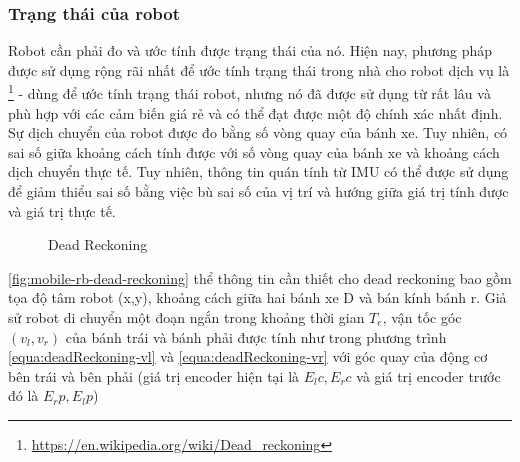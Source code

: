 {\subsubsection*{Trạng thái của robot}
Robot cần phải đo và ước tính được trạng thái của nó. Hiện nay, phương pháp được sử dụng rộng rãi nhất để ước tính trạng thái trong nhà cho robot dịch vụ là \footnote{\url{https://en.wikipedia.org/wiki/Dead_reckoning}} - dùng để ước tính trạng thái robot, nhưng nó đã được sử dụng từ rất lâu và phù hợp với các cảm biến giá rẻ và có thể đạt được một độ chính xác nhất định. Sự dịch chuyển của robot được đo bằng số vòng quay của bánh xe. Tuy nhiên, có sai số giữa khoảng cách tính được với số vòng quay của bánh xe và khoảng cách dịch chuyển thực tế. Tuy nhiên, thông tin quán tính từ IMU có thể được sử dụng để giảm thiểu sai số bằng việc bù sai số của vị trí và hướng giữa giá trị tính được và giá trị thực tế.

\begin{figure}
\centering
{}
  \caption{Dead Reckoning}
  \label{fig:deadReckoning}
\end{figure}

\figurename{ \ref{fig:mobile-rb-dead-reckoning}} thể thông tin cần thiết cho dead reckoning
bao gồm tọa độ tâm robot (x,y), khoảng cách giữa hai bánh xe D và bán kính bánh r.
Giả sử robot di chuyển một đoạn ngắn trong khoảng thời gian ${T}_{e}$, vận tốc góc $({v}_{l}, {v}_{r})$ của bánh trái và bánh phải được tính như trong phương trình \ref{equa:deadReckoning-vl} và \ref{equa:deadReckoning-vr} với góc quay của động cơ bên trái và bên phải (giá trị encoder hiện tại là ${E}_{l}c, {E}_{r}c$ và giá trị encoder trước đó là ${E}_{r}p, {E}_{l}p$)

}
